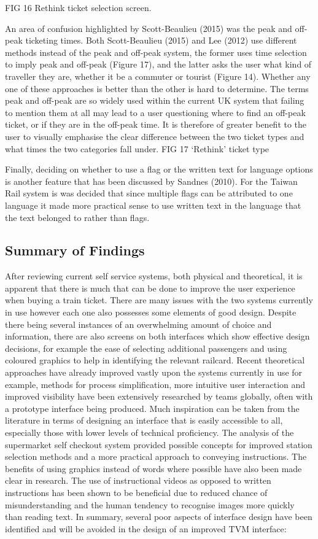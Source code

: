 FIG 16 Rethink ticket selection screen.

An area of confusion highlighted by Scott-Beaulieu (2015)  was the peak and off-peak ticketing times. Both Scott-Beaulieu (2015) and Lee (2012) use different methods instead of the peak and off-peak system, the former uses time selection to imply peak and off-peak (Figure 17), and the latter asks the user what kind of traveller they are, whether it be a commuter or tourist (Figure 14). Whether any one of these approaches is better than the other is hard to determine. The terms peak and off-peak are so widely used within the current UK system that failing to mention them at all may lead to a user questioning where to find an off-peak ticket, or if they are in the off-peak time. It is therefore of greater benefit to the user to visually emphasise the clear difference between the two ticket types and what times the two categories fall under.
FIG 17 ‘Rethink’ ticket type	


Finally, deciding on whether to use a flag or the written text for language options is another feature that has been discussed by Sandnes (2010). For the Taiwan Rail system is was decided that since multiple flags can be attributed to one language it made more practical sense to use written text in the language that the text belonged to rather than flags.

\subsection{Summary of Findings}
After reviewing current self service systems, both physical and theoretical, it is apparent that there is much that can be done to improve the user experience when buying a train ticket. There are many issues with the two systems currently in use however each one also possesses some elements of good design. 
Despite there being several instances of an overwhelming amount of choice and information, there are also screens on both interfaces which show effective design decisions, for example the ease of selecting additional passengers and using coloured graphics to help in identifying the relevant railcard.
Recent theoretical approaches have already improved vastly upon the systems currently in use for example, methods for process simplification, more intuitive user interaction and improved visibility have been extensively researched by teams globally, often with a prototype interface being produced. Much inspiration can be taken from the literature in terms of designing an interface that is easily accessible to all, especially those with lower levels of technical proficiency.
The analysis of the supermarket self checkout system provided possible concepts for improved station selection methods and a more practical approach to conveying instructions. The benefits of using graphics instead of words where possible have also been made clear in research. The use of instructional videos as opposed to written instructions has been shown to be beneficial due to reduced chance of misunderstanding and the human tendency to recognise images more quickly than reading text.
In summary, several poor aspects of interface design have been identified and will be avoided in the design of an improved TVM interface:

